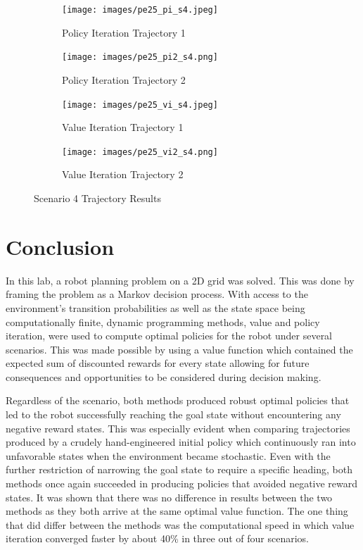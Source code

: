 \documentclass[fullpage]{article}
\begin{document}
\begin{figure}[H]
\begin{subfigure}{.5\textwidth}
\centering
\texttt{[image: images/pe25\_pi\_s4.jpeg]}
\caption{Policy Iteration Trajectory 1}
\label{fig:2a}
\end{subfigure}
\begin{subfigure}{.5\textwidth}
\centering
\texttt{[image: images/pe25\_pi2\_s4.png]}
\caption{Policy Iteration Trajectory 2}
\label{fig:2b}
\end{subfigure}
\begin{subfigure}{.5\textwidth}
\centering
\texttt{[image: images/pe25\_vi\_s4.jpeg]}
\caption{Value Iteration Trajectory 1}
\label{fig:3a}
\end{subfigure}
\begin{subfigure}{.5\textwidth}
\centering
\texttt{[image: images/pe25\_vi2\_s4.png]}
\caption{Value Iteration Trajectory 2}
\label{fig:3b}
\end{subfigure}
\caption{Scenario 4 Trajectory Results}
\end{figure}

\section{Conclusion}
In this lab, a robot planning problem on a 2D grid was solved. This was done by framing the problem as a Markov decision process. With access to the environment's transition probabilities as well as the state space being computationally finite, dynamic programming methods, value and policy iteration, were used to compute optimal policies for the robot under several scenarios. This was made possible by using a value function which contained the expected sum of discounted rewards for every state allowing for future consequences and opportunities to be considered during decision making. 

Regardless of the scenario, both methods produced robust optimal policies that led to the robot successfully reaching the goal state without encountering any negative reward states. This was especially evident when comparing trajectories produced by a crudely hand-engineered initial policy which continuously ran into unfavorable states when the environment became stochastic. Even with the further restriction of narrowing the goal state to require a specific heading, both methods once again succeeded in producing policies that avoided negative reward states. It was shown that there was no difference in results between the two methods as they both arrive at the same optimal value function. The one thing that did differ between the methods was the computational speed in which value iteration converged faster by about 40\% in three out of four scenarios.
\end{document}
